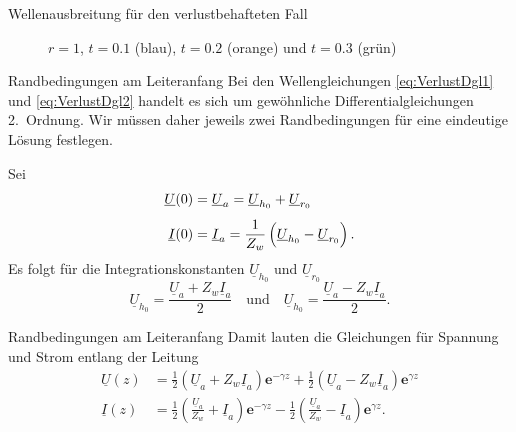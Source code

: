 \documentclass{beamer}
\begin{document}
\begin{frame}{Wellenausbreitung für den verlustbehafteten Fall}
\begin{figure}[H]
\begin{minipage}{0.32\textwidth}
        \caption*{$r=1$, $t=0.1$ (blau), $t=0.2$ (orange) und $t=0.3$ (grün)}
    \end{minipage}
\end{figure}
\end{frame}


\begin{frame}{Randbedingungen am Leiteranfang}
Bei den Wellengleichungen \eqref{eq:VerlustDgl1} und \eqref{eq:VerlustDgl2} handelt es sich um
gewöhnliche Differentialgleichungen 2.~Ordnung. Wir müssen daher jeweils zwei Randbedingungen für
eine eindeutige Lösung festlegen.

\vspace{1ex}
Sei
\begin{align*}
    \underline{U}(0) &= \underline{U}_{a} = \underline{U}_{h_{0}} + \underline{U}_{r_{0}} \\[1ex]
    \underline{I}(0) &= \underline{I}_{a} = \frac{1}{Z_{w}}
    \left(
    \vphantom{\sqrt{1}{Z_{w}}}
    \underline{U}_{h_{0}} - \underline{U}_{r_{0}} \right).
\end{align*}
Es folgt für die Integrationskonstanten $\underline{U}_{h_{0}}$ und $\underline{U}_{r_{0}}$
\[ \underline{U}_{h_{0}} = \frac{\underline{U}_{a} + Z_{w} \underline{I}_{a}}{2}
\quad \text{und} \quad
\underline{U}_{h_{0}} = \frac{\underline{U}_{a} - Z_{w} \underline{I}_{a}}{2}. \]
\end{frame}


\begin{frame}{Randbedingungen am Leiteranfang}
Damit lauten die Gleichungen für Spannung und Strom entlang der Leitung
\begin{align}
    \underline{U}(z) &=
    \frac{1}{2} \left( \underline{U}_{a} + Z_{w} \underline{I}_{a} \right) \mathbf{e}^{- \gamma z}
    +
    \frac{1}{2} \left( \underline{U}_{a} - Z_{w} \underline{I}_{a} \right) \mathbf{e}^{\gamma z} \label{eq:UxA}
    \\[1ex]
    \underline{I}(z) &=
    \frac{1}{2} \left( \frac{\underline{U}_{a}}{Z_{w}} + \underline{I}_{a} \right) \mathbf{e}^{- \gamma z}
    -
    \frac{1}{2} \left( \frac{\underline{U}_{a}}{Z_{w}} - \underline{I}_{a} \right) \mathbf{e}^{\gamma z}
    \label{eq:IxA}
    .
\end{align}
\end{frame}
\end{document}
